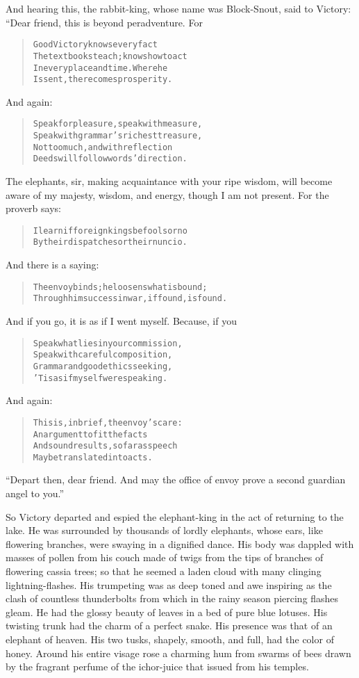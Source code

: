 \documentclass[article, twoside, 14pt]{memoir}
\renewenvironment{verbatim}{%
\begin{quote}%
\vskip -10pt%
\begin{alltt}\normalfont\large}{\end{alltt}%
\end{quote}%
\vskip -10pt
} %
\begin{document}
And hearing this, the rabbit-king, whose name was Block-Snout, said
to Victory: “Dear friend, this is beyond peradventure. For

\begin{verbatim}
Good Victory knows every fact
The textbooks teach; knows how to act
In every place and time. Where he
Is sent, there comes prosperity.
\end{verbatim}
And again:

\begin{verbatim}
Speak for pleasure, speak with measure,
Speak with grammar's richest treasure,
Not too much, and with reflection{\textemdash}
Deeds will follow words' direction.
\end{verbatim}
The elephants, sir, making acquaintance with your ripe wisdom, will
become aware of my majesty, wisdom, and energy, though I am not
present. For the proverb says:

\begin{verbatim}
I learn if foreign kings be fools or no
By their dispatches or their nuncio.
\end{verbatim}
And there is a saying:

\begin{verbatim}
The envoy binds; he loosens what is bound;
Through him success in war, if found, is found.
\end{verbatim}
And if you go, it is as if I went myself. Because, if you

\begin{verbatim}
Speak what lies in your commission,
Speak with careful composition,
Grammar and good ethics seeking,
'Tis as if myself were speaking.
\end{verbatim}
And again:

\begin{verbatim}
This is, in brief, the envoy's care:
    An argument to fit the facts
And sound results, so far as speech
    May be translated into acts.
\end{verbatim}
``Depart then, dear friend. And may the office of envoy prove a second guardian angel to you.''

So Victory departed and espied the elephant-king in the act of
returning to the lake. He was surrounded by thousands of lordly
elephants, whose ears, like flowering branches, were swaying in a
dignified dance. His body was dappled with masses of pollen from
his couch made of twigs from the tips of branches of flowering
cassia trees; so that he seemed a laden cloud with many clinging
lightning-flashes. His trumpeting was as deep toned and awe
inspiring as the clash of countless thunderbolts from which in the
rainy season piercing flashes gleam. He had the glossy beauty of
leaves in a bed of pure blue lotuses. His twisting trunk had the
charm of a perfect snake. His presence was that of an elephant of
heaven. His two tusks, shapely, smooth, and full, had the color of
honey. Around his entire visage rose a charming hum from swarms of
bees drawn by the fragrant perfume of the ichor-juice that issued
from his temples.
\end{document}
